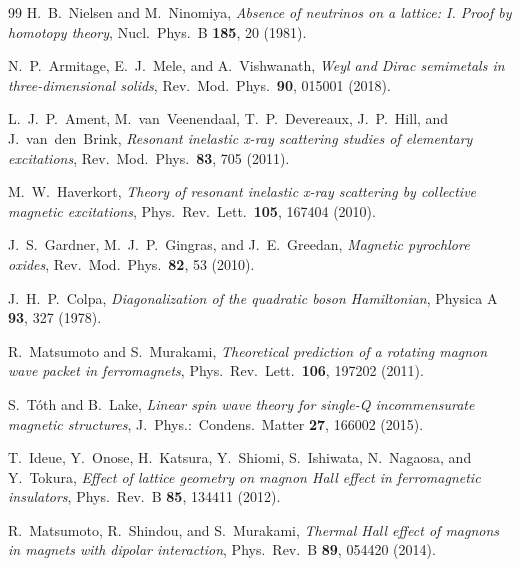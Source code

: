 \documentclass[aps,prb,twocolumn,superscriptaddress,longbibliography]{revtex4-2}
\begin{document}
\begin{thebibliography}{99}
H.~B.~Nielsen and M.~Ninomiya,
\textit{Absence of neutrinos on a lattice: I. Proof by homotopy theory},
Nucl.\ Phys.\ B \textbf{185}, 20 (1981).

N.~P.~Armitage, E.~J.~Mele, and A.~Vishwanath,
\textit{Weyl and Dirac semimetals in three-dimensional solids},
Rev.\ Mod.\ Phys.\ \textbf{90}, 015001 (2018).

L.~J.~P.~Ament, M.~van~Veenendaal, T.~P.~Devereaux, J.~P.~Hill, and
J.~van~den~Brink,
\textit{Resonant inelastic x-ray scattering studies of elementary
excitations},
Rev.\ Mod.\ Phys.\ \textbf{83}, 705 (2011).

M.~W.~Haverkort,
\textit{Theory of resonant inelastic x-ray scattering by collective magnetic
excitations},
Phys.\ Rev.\ Lett.\ \textbf{105}, 167404 (2010).

J.~S.~Gardner, M.~J.~P.~Gingras, and J.~E.~Greedan,
\textit{Magnetic pyrochlore oxides},
Rev.\ Mod.\ Phys.\ \textbf{82}, 53 (2010).

J.~H.~P.~Colpa,
\textit{Diagonalization of the quadratic boson Hamiltonian},
Physica A \textbf{93}, 327 (1978).

R.~Matsumoto and S.~Murakami,
\textit{Theoretical prediction of a rotating magnon wave packet in ferromagnets},
Phys.\ Rev.\ Lett.\ \textbf{106}, 197202 (2011).

S.~T\'oth and B.~Lake,
\textit{Linear spin wave theory for single-Q incommensurate magnetic
structures},
J.\ Phys.:\ Condens.\ Matter \textbf{27}, 166002 (2015).

T.~Ideue, Y.~Onose, H.~Katsura, Y.~Shiomi, S.~Ishiwata, N.~Nagaosa, and Y.~Tokura,
\textit{Effect of lattice geometry on magnon Hall effect in ferromagnetic
insulators},
Phys.\ Rev.\ B \textbf{85}, 134411 (2012).

R.~Matsumoto, R.~Shindou, and S.~Murakami,
\textit{Thermal Hall effect of magnons in magnets with dipolar interaction},
Phys.\ Rev.\ B \textbf{89}, 054420 (2014).

\end{thebibliography}
\end{document}
